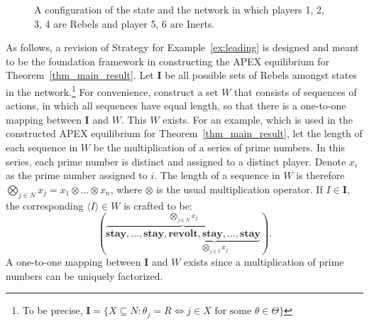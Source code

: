 \documentclass[12pt,letter]{article}
\theoremstyle{definition}
\theoremstyle{definition}
\theoremstyle{remark}
\theoremstyle{claim}
\begin{document}
\begin{figure}
\begin{center}
\end{center}
\caption{A configuration of the state and the network in which players 1, 2, 3, 4 are Rebels and player 5, 6 are Inerts.}
\label{fig:circle_with_bridge_4}
\end{figure}

As follows, a revision of Strategy for Example~\ref{ex:leading} is designed and meant to be the foundation framework in constructing the APEX equilibrium for Theorem~\ref{thm_main_result}. Let $\mathbf{I}$ be all possible sets  of Rebels amongst states in the network.\footnote{To be precise, $\mathbf{I}=\{X\subseteq N: \theta_j=R \Leftrightarrow j\in X \text{ for some $\theta\in\Theta$}\}$} 
For convenience, construct a set $W$ that consists of sequences of actions, in which all sequences have equal length, so that there is a one-to-one mapping between $\mathbf{I}$ and $W$. This $W$ exists. For an example, which is used in the constructed APEX equilibrium for Theorem~\ref{thm_main_result}, let the length of each sequence in $W$ be the multiplication of a series of prime numbers. In this series, each prime number is distinct and assigned to a distinct player. Denote $x_i$ as the prime number assigned to $i$. The length of a sequence in $W$ is therefore $\bigotimes_{j\in N}x_j=x_1\otimes...\otimes x_n$, where $\otimes$ is the usual multiplication operator. If $I\in\mathbf{I}$, the corresponding $\langle I \rangle\in W$ is crafted to be:  
\[(\overbrace{\textbf{stay},...,\textbf{stay},\underbrace{\textbf{revolt},\textbf{stay},...,\textbf{stay}}_{\bigotimes_{j\in I}x_j}}^{\bigotimes_{j\in N} x_j}).\]
A one-to-one mapping between $\mathbf{I}$ and ${W}$ exists since a multiplication of prime numbers can be uniquely factorized. 
\end{document}
